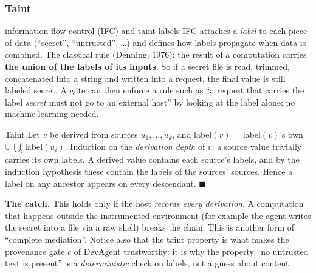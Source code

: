 \subsubsection{Taint}

\begin{toolbox}{information-flow control (IFC) and taint labels}
IFC attaches a \emph{label} to each piece of data (``secret'', ``untrusted'', \dots) and defines how labels propagate when data is combined. The classical rule (Denning, 1976): the result of a computation carries \textbf{the union of the labels of its inputs}. So if a secret file is read, trimmed, concatenated into a string and written into a request, the final value is still labeled secret. A gate can then enforce a rule such as ``a request that carries the label \emph{secret} must not go to an external host'' by looking at the label alone; no machine learning needed.
\end{toolbox}

\begin{plainproof}{Taint}
Let $v$ be derived from sources $u_1,\dots,u_k$, and label$(v)$ = label$(v)$'s own $\cup\ \bigcup_i$label$(u_i)$. Induction on the \emph{derivation depth} of $v$: a source value trivially carries its own labels. A derived value contains each source's labels, and by the induction hypothesis these contain the labels of the sources' sources. Hence a label on any ancestor appears on every descendant. \hfill$\blacksquare$
\end{plainproof}

\textbf{The catch.} This holds only if the host \emph{records every derivation}. A computation that happens outside the instrumented environment (for example the agent writes the secret into a file via a raw shell) breaks the chain. This is another form of ``complete mediation''. Notice also that the taint property is what makes the provenance gate $c$ of DevAgent trustworthy: it is why the property ``no untrusted text is present'' is a \emph{deterministic} check on labels, not a guess about content.


